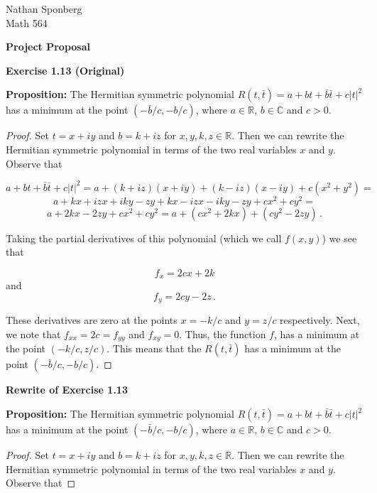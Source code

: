 \documentclass[a4paper]{article}
\numberwithin{equation}{section}
\begin{document}
\begin{flushright}
{\small{Nathan Sponberg\\}}
{\small{Math 564}}
\end{flushright}

\begin{center}
\bf{Project Proposal}
\end{center}

\begin{description}

\item \textbf{Exercise 1.13 (Original)}

\item \textbf{Proposition: }The Hermitian symmetric polynomial $R(t,\bar{t}) = a + bt + \bar{b}\bar{t} + c|t|^2$ has a minimum at the point $(-\bar{b}/c,-b/c)$, where $a \in \mathbb{R}$, $b \in \mathbb{C}$ and $c > 0$.

\begin{proof} Set $t = x+iy$ and $b = k + iz$ for $x,y,k,z \in \mathbb{R}$. Then we can rewrite the Hermitian symmetric polynomial in terms of the two real variables $x$ and $y$. Observe that 

$$a + bt + \bar{b}\bar{t} + c|t|^2 = a + (k + iz)(x + iy) + (k-iz)(x-iy) + c(x^2+y^2) = $$
$$a + kx + izx +iky - zy + kx - izx - iky - zy + cx^2 + cy^2 = $$
$$a + 2kx - 2zy + cx^2 + cy^2 = a + (cx^2 + 2kx) + (cy^2 - 2zy)\,.$$

Taking the partial derivatives of this polynomial (which we call $f(x,y)$) we see that

$$f_x = 2cx + 2k$$
and
$$f_y = 2cy - 2z\,.$$

These derivatives are zero at the points $x = -k/c$
and $y = z/c$ respectively. Next, we note that $f_{xx} = 2c = f_{yy}$ and $f_{xy} = 0$. Thus, the function $f$, has a minimum at the point $(-k/c,z/c)$. This means that the $R(t,\bar{t})$ has a minimum at the point $(-\bar{b}/c,-b/c)$.

\end{proof}

\item \textbf{Rewrite of Exercise 1.13}

\item \textbf{Proposition: }The Hermitian symmetric polynomial $R(t,\bar{t}) = a + bt + \bar{b}\bar{t} + c|t|^2$ has a minimum at the point $(-\bar{b}/c,-b/c)$, where $a \in \mathbb{R}$, $b \in \mathbb{C}$ and $c > 0$.

\begin{proof} Set $t = x+iy$ and $b = k + iz$ for $x,y,k,z \in \mathbb{R}$. Then we can rewrite the Hermitian symmetric polynomial in terms of the two real variables $x$ and $y$. Observe that 


\end{proof}
\end{description}
\end{document}
